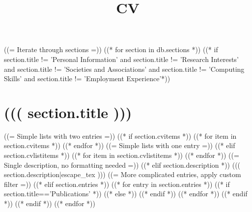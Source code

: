 \documentclass[10pt,a4paper,sans]{moderncv}
\title{CV}
\begin{document}
  \makecvtitle
  ((= Iterate through sections =))
  ((* for section in db.sections *))
  ((* if section.title != 'Personal Information' and section.title != 'Research Interests' and section.title != 'Societies and Associations' and section.title != 'Computing Skills' and section.title != 'Employment Experience'*))
  \section{((( section.title )))}
  ((= Simple lists with two entries =))
  ((* if section.cvitems *))
  ((* for item in section.cvitems *))
  ((* endfor *))
  ((= Simple lists with one entry =))
  ((* elif section.cvlistitems *))
  ((* for item in section.cvlistitems *))
  ((* endfor *))
  ((= Single description, no formatting needed =))
  ((* elif section.description *))
  ((( section.description|escape_tex )))
  ((= More complicated entries, apply custom filter =))
  ((* elif section.entries *))
  ((* for entry in section.entries *))
  ((* if section.title=='Publications' *))
  ((* else *))
  ((* endif *))
  ((* endfor *))
  ((* endif *))
  ((* endif *))
  ((* endfor *))
\end{document}
